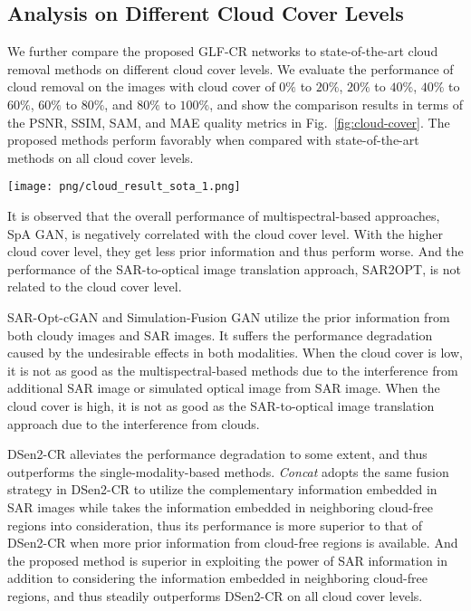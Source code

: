 \documentclass[a4paper,fleqn]{cas-dc}
\begin{document}
\subsection{Analysis on Different Cloud Cover Levels}
We further compare the proposed GLF-CR networks to state-of-the-art cloud removal methods on different cloud cover levels. We evaluate the performance of cloud removal on the images with cloud cover of $0\%$ to $20\%$, $20\%$ to $40\%$, $40\%$ to $60\%$, $60\%$ to $80\%$, and $80\%$ to $100\%$, and show the comparison results in terms of the PSNR, SSIM, SAM, and MAE quality metrics in Fig.~\ref{fig:cloud-cover}. The proposed methods perform favorably when compared with state-of-the-art methods on all cloud cover levels. 






\begin{figure*}[!t]
     \centering
     \texttt{[image: png/cloud\_result\_sota\_1.png]}
     \vspace{-2mm}
     \caption{Quantitative comparisons of proposed GLF-Nets to state-of-the-art methods on different cloud cover levels in terms of the PSNR, SSIM, SAM, and MAE quality metrics.}
     \label{fig:cloud-cover}
     \vspace{-7mm}
\end{figure*} 
It is observed that the overall performance of multispectral-based approaches, SpA GAN, is negatively correlated with the cloud cover level. With the higher cloud cover level, they get less prior information and thus perform worse. And the performance of the SAR-to-optical image translation approach, SAR2OPT, is not related to the cloud cover level. 

SAR-Opt-cGAN and Simulation-Fusion GAN utilize the prior information from both cloudy images and SAR images. It suffers the performance degradation caused by the undesirable effects in both modalities. When the cloud cover is low, it is not as good as the multispectral-based methods due to the interference from additional SAR image or simulated optical image from SAR image. When the cloud cover is high, it is not as good as the SAR-to-optical image translation approach due to the interference from clouds.

DSen2-CR alleviates the performance degradation to some extent, and thus outperforms the single-modality-based methods. {\it Concat} adopts the same fusion strategy in DSen2-CR to utilize the complementary information embedded in SAR images while takes the information embedded in neighboring cloud-free regions into consideration, thus its performance is more superior to that of DSen2-CR when more prior information from cloud-free regions is available.
And the proposed method is superior in exploiting the power of SAR information in addition to considering the information embedded in neighboring cloud-free regions, and thus steadily outperforms DSen2-CR on all cloud cover levels.
\end{document}
